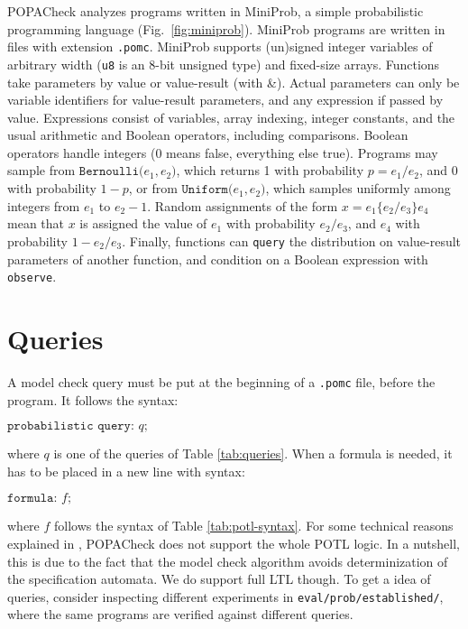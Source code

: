 \documentclass[9pt,a4paper]{article}
\begin{document}
POPACheck analyzes programs written in MiniProb, a simple probabilistic programming language (Fig.~\ref{fig:miniprob}). MiniProb programs are written in files with extension \verb|.pomc|.
MiniProb supports (un)signed integer variables of arbitrary width
(\texttt{u8} is an 8-bit unsigned type) and fixed-size arrays.
Functions take parameters by value or value-result (with \&).
Actual parameters can only be variable identifiers for value-result parameters,
and any expression if passed by value.
Expressions consist of variables, array indexing, integer constants, and the usual arithmetic and Boolean operators, including comparisons.
Boolean operators handle integers (0 means false, everything else true).
Programs may sample from $\texttt{Bernoulli(} e_1, e_2 \texttt{)}$,
which returns 1 with probability $p = e_1 / e_2$, and 0 with probability $1-p$,
or from $\texttt{Uniform(} e_1, e_2 \texttt{)}$,
which samples uniformly among integers from $e_1$ to $e_2 - 1$.
Random assignments of the form $x = e_1 \{ e_2 / e_3 \} e_4$ mean that $x$ is assigned
the value of $e_1$ with probability $e_2 / e_3$, and $e_4$ with probability $1 - e_2 / e_3$.
Finally, functions can \texttt{query} the distribution on value-result parameters of another function, and condition on a Boolean expression with \texttt{observe}.

\section{Queries}
\label{sec:queries}
A model check query must be put at the beginning of a \verb|.pomc| file, before the program. It follows the syntax: 
\begin{center}
    $\texttt{probabilistic query:} \, \, q \texttt{;}$
\end{center}
where $q$ is one of the queries of Table \ref{tab:queries}. When a formula is needed, it has to be placed in a new line with syntax:
\begin{center}
    $\texttt{formula:} \, \, f \texttt{;}$
\end{center}
where $f$ follows the syntax of Table \ref{tab:potl-syntax}. For some technical reasons explained in \cite{abs-2404-03515}, POPACheck does not support the whole POTL logic. In a nutshell, this is due to the fact that the model check algorithm avoids determinization of the specification automata. We do support full LTL though. To get a idea of queries, consider inspecting different experiments in \verb|eval/prob/established/|, where the same programs are verified against different queries.
\end{document}
